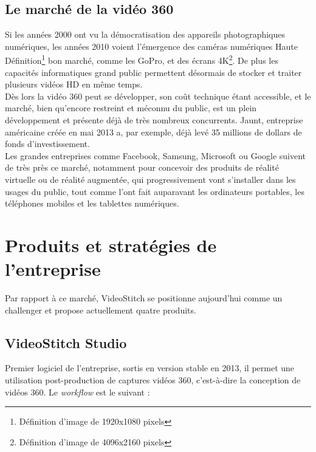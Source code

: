 \subsection{Le marché de la vidéo 360}
Si les années 2000 ont vu la démocratisation des appareils photographiques numériques,
les années 2010 voient l'émergence des caméras numériques Haute 
Définition\footnote{Définition d'image de 1920x1080 pixels} bon marché, comme les GoPro,
et des écrans 4K\footnote{Définition d'image de 4096x2160 pixels}. De plus les capacités
informatiques grand public permettent désormais de stocker et traiter plusieurs 
vidéos HD en même temps.\\
Dès lors la vidéo 360 peut se développer, son coût technique
étant accessible, et le marché, bien qu'encore restreint et méconnu du public,
est un plein développement et présente déjà de très nombreux concurrents. Jaunt,
entreprise américaine créée en mai 2013 a, par exemple, déjà levé 35 millions
de dollars de fonds d'investissement\cite{jaunt-fundings}.\\
Les grandes entreprises comme Facebook\cite{facebook-vr}, Samsung\cite{samsung-vr}, 
Microsoft\cite{microsoft-vr} ou Google\cite{google-vr} suivent de
très près ce marché, notamment pour concevoir des produits de réalité virtuelle 
ou de réalité augmentée, qui progressivement vont s'installer dans les usages
du public, tout comme l'ont fait auparavant les ordinateurs portables, les téléphones mobiles
et les tablettes numériques.\\

\section{Produits et stratégies de l'entreprise}
Par rapport à ce marché, VideoStitch se positionne aujourd'hui comme un challenger
et propose actuellement quatre produits\cite{videostitch-products}.
\subsection{VideoStitch Studio}
\label{videostitch-studio}
Premier logiciel de l'entreprise, sortis en version stable en 2013,
il permet une utilisation post-production de captures vidéos 360, c'est-à-dire 
la conception de vidéos 360. Le \textit{workflow} est le suivant : 
